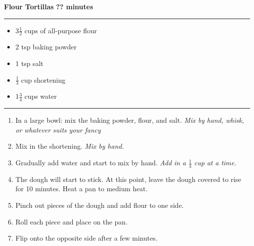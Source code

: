 {\huge \textbf{Flour Tortillas}} \hfill {\large \textbf{?? minutes}}

\vspace{15pt} \hrule \vspace{15pt}
\begin{itemize}
	\item 3$\frac{1}{2}$ cups of all-purpose flour
	\item 2 tsp baking powder
	\item 1 tsp salt
	\item $\frac{1}{3}$ cup shortening
	\item 1$\frac{3}{4}$ cups water
\end{itemize}

\vspace{15pt} \hrule \vspace{15pt}
\begin{enumerate}
	\item In a large bowl: mix the baking powder, flour, and salt. \textit{Mix by hand, whisk, or whatever suits your fancy}
	\item Mix in the shortening. \textit{Mix by hand.}
	\item Gradually add water and start to mix by hand. \textit{Add in a $\frac{1}{4}$ cup at a time.}
	\item The dough will start to stick. At this point, leave the dough covered to rise for 10 minutes. Heat a pan to medium heat.
	\item Pinch out pieces of the dough and add flour to one side.
	\item Roll each piece and place on the pan.
	\item Flip onto the opposite side after a few minutes.
\end{enumerate}
